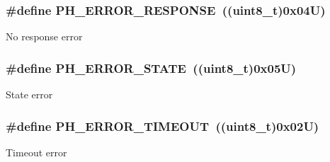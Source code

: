 \subsubsection[{\texorpdfstring{P\+H\+\_\+\+E\+R\+R\+O\+R\+\_\+\+R\+E\+S\+P\+O\+N\+SE}{PH_ERROR_RESPONSE}}]{\setlength{\rightskip}{0pt plus 5cm}\#define P\+H\+\_\+\+E\+R\+R\+O\+R\+\_\+\+R\+E\+S\+P\+O\+N\+SE~((uint8\+\_\+t)0x04\+U)}\hypertarget{group___p_h___error___code_ga104872de885107db19b579c81a62f563}{}\label{group___p_h___error___code_ga104872de885107db19b579c81a62f563}
No response error 
\subsubsection[{\texorpdfstring{P\+H\+\_\+\+E\+R\+R\+O\+R\+\_\+\+S\+T\+A\+TE}{PH_ERROR_STATE}}]{\setlength{\rightskip}{0pt plus 5cm}\#define P\+H\+\_\+\+E\+R\+R\+O\+R\+\_\+\+S\+T\+A\+TE~((uint8\+\_\+t)0x05\+U)}\hypertarget{group___p_h___error___code_ga495ce5ac265432fc88f35462ea1515f8}{}\label{group___p_h___error___code_ga495ce5ac265432fc88f35462ea1515f8}
State error 
\subsubsection[{\texorpdfstring{P\+H\+\_\+\+E\+R\+R\+O\+R\+\_\+\+T\+I\+M\+E\+O\+UT}{PH_ERROR_TIMEOUT}}]{\setlength{\rightskip}{0pt plus 5cm}\#define P\+H\+\_\+\+E\+R\+R\+O\+R\+\_\+\+T\+I\+M\+E\+O\+UT~((uint8\+\_\+t)0x02\+U)}\hypertarget{group___p_h___error___code_gaae8d2172a18fdde6957c77af378c2574}{}\label{group___p_h___error___code_gaae8d2172a18fdde6957c77af378c2574}
Timeout error 
